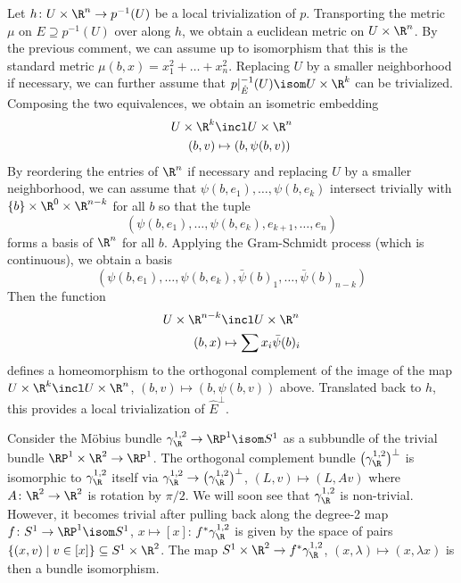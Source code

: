 \begin{definition}
\begin{enumerate}[resume]
			Let $h\colon U \times \R^n \to p^{-1}(U)$ be a local trivialization of $p$. 
			Transporting the metric $\mu$ on $E \supseteq p^{-1}(U)$ over along $h$, we obtain a euclidean metric on $U \times \R^n$.
			By the previous comment, we can assume up to isomorphism that this is the standard metric $\mu(b, x) = x_1^2 + \ldots + x_n^2$.
			Replacing $U$ by a smaller neighborhood if necessary, we can further assume that $p|_{\hat{E}}^{-1}(U) \isom U \times \R^k$ can be trivialized.
			Composing the two equivalences, we obtain an isometric embedding
			\begin{align*}
				U \times \R^k &\incl U \times \R^n \\
				(b, v) &\mapsto (b, \psi(b, v))
			\end{align*}
			By reordering the entries of $\R^n$ if necessary and replacing $U$ by a smaller neighborhood, we can assume that $\psi(b, e_1), \ldots, \psi(b, e_k)$ intersect trivially with $\{b\} \times \R^0 \times \R^{n - k}$ for all $b$ so that the tuple 
			\begin{equation*}
				(\psi(b, e_1), \ldots, \psi(b, e_k), e_{k + 1}, \ldots, e_n)
			\end{equation*}
			forms a basis of $\R^n$ for all $b$.
			Applying the Gram-Schmidt process (which is continuous), we obtain a basis 
			\begin{equation*}
				(\psi(b, e_1), \ldots, \psi(b, e_k), \bar{\psi}(b)_1, \ldots, \bar{\psi}(b)_{n - k})
			\end{equation*}
			Then the function
			\begin{align*}
				U \times \R^{n - k} &\incl U \times \R^n \\
				(b, x) &\mapsto \sum x_i \bar{\psi}(b)_i
			\end{align*}
			defines a homeomorphism to the orthogonal complement of the image of the map $U \times \R^k \incl U \times \R^n$, $(b, v) \mapsto (b, \psi(b, v))$ above.
			Translated back to $h$, this provides a local trivialization of $\hat{E}^\perp$.
	\end{enumerate}
\end{definition}
\begin{example}
	Consider the Möbius bundle $\gamma_{\R}^{1, 2} \to \RP^1 \isom S^1$ as a subbundle of the trivial bundle $\RP^1 \times \R^2 \to \RP^1$.
	The orthogonal complement bundle $\big(\gamma_{\R}^{1, 2}\big)^\perp$ is isomorphic to $\gamma_{\R}^{1, 2}$ itself via $\gamma_{\R}^{1, 2} \to \big(\gamma_{\R}^{1, 2}\big)^\perp$, $(L, v) \mapsto (L, Av)$ where $A\colon \R^2 \to \R^2$ is rotation by $\pi / 2$.
	We will soon see that $\gamma_{\R}^{1, 2}$ is non-trivial.
	However, it becomes trivial after pulling back along the degree-2 map $f\colon S^1 \to \RP^1 \isom S^1$, $x \mapsto [x]$:
	$f^* \gamma_{\R}^{1, 2}$ is given by the space of pairs $\{(x, v) \mid v \in [x]\} \subseteq S^1 \times \R^2$.
	The map $S^1 \times \R^2 \to f^* \gamma_{\R}^{1, 2}$, $(x, \lambda) \mapsto (x, \lambda x)$ is then a bundle isomorphism.
\end{example}
